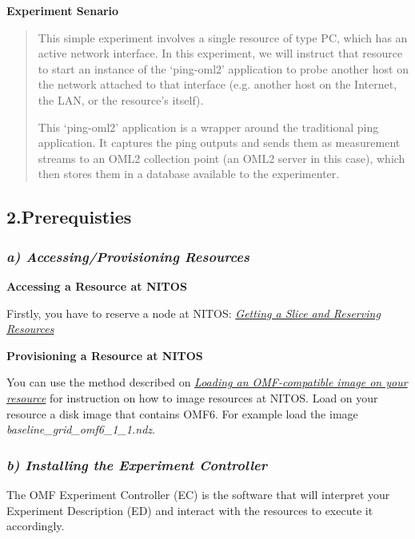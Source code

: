 \documentclass[letterpaper,10pt,english]{sphinxmanual}
\begin{document}
\textbf{Experiment Senario}
\begin{quote}

This simple experiment involves a single resource of type PC, which has an active network interface. In this experiment, we will instruct that resource to start an instance of the `ping-oml2' application to probe another host on the network attached to that interface (e.g. another host on the Internet, the LAN, or the resource's itself).

This `ping-oml2' application is a wrapper around the traditional ping application. It captures the ping outputs and sends them as measurement streams to an OML2 collection point (an OML2 server in this case), which then stores them in a database available to the experimenter.
\end{quote}


\subsection{2.Prerequisties}
\label{omf_example:prerequisties}

\subsubsection{\emph{a) Accessing/Provisioning Resources}}
\label{omf_example:a-accessing-provisioning-resources}
\begin{DUlineblock}{0em}
\item[] \textbf{Accessing a Resource at NITOS}
\item[] 
\item[] Firstly, you have to reserve a node at NITOS: {\hyperref[get_reserve:label-name]{\emph{Getting a Slice and Reserving Resources}}}
\end{DUlineblock}

\begin{DUlineblock}{0em}
\item[] \textbf{Provisioning a Resource at NITOS}
\item[] 
\item[] You can use the method described on {\hyperref[loadOMF:label-name-2]{\emph{Loading an OMF-compatible image on your resource}}} for instruction on how to image resources at NITOS. Load on your resource a disk image that contains OMF6. For example load the image \emph{baseline\_grid\_omf6\_1\_1.ndz}.
\end{DUlineblock}


\subsubsection{\emph{b) Installing the Experiment Controller}}
\label{omf_example:b-installing-the-experiment-controller}
The OMF Experiment Controller (EC) is the software that will interpret your Experiment Description (ED) and interact with the resources to execute it accordingly.
\end{document}
